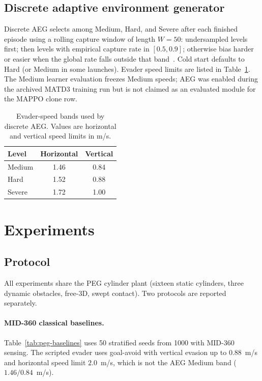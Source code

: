 \documentclass{SCIS2026}
\begin{document}
\subsection{Discrete adaptive environment generator}
\label{sec:aeg}
Discrete AEG selects among Medium, Hard, and Severe after each finished episode using a rolling capture window of length $W=50$: undersampled levels first; then levels with empirical capture rate in $[0.5,0.9]$; otherwise bias harder or easier when the global rate falls outside that band~\cite{open2024}. Cold start defaults to Hard (or Medium in some launches). Evader speed limits are listed in Table~\ref{tab:levels}. The Medium learner evaluation freezes Medium speeds; AEG was enabled during the archived MATD3 training run but is not claimed as an evaluated module for the MAPPO clone row.

\begin{table}[H]
\footnotesize
\caption{Evader-speed bands used by discrete AEG. Values are horizontal and vertical speed limits in m/s.}
\label{tab:levels}
\begin{tabularx}{\textwidth}{lcc}
\toprule
Level & Horizontal & Vertical \\\hline
Medium & 1.46 & 0.84 \\
Hard & 1.52 & 0.88 \\
Severe & 1.72 & 1.00 \\
\bottomrule
\end{tabularx}
\end{table}

\section{Experiments}
\label{sec:exp}
\subsection{Protocol}
All experiments share the PEG cylinder plant (sixteen static cylinders, three dynamic obstacles, free-3D, swept contact). Two protocols are reported separately.

\paragraph{MID-360 classical baselines.}
Table~\ref{tab:peg-baselines} uses 50 stratified seeds from 1000 with MID-360 sensing. The scripted evader uses goal-avoid with vertical evasion up to $0.88$~m/s and horizontal speed limit $2.0$~m/s, which is not the AEG Medium band ($1.46/0.84$~m/s).
\end{document}
